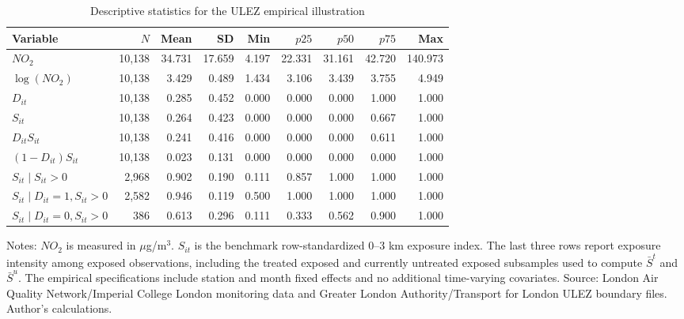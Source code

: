 \begin{table}[!htbp]\centering
\caption{Descriptive statistics for the ULEZ empirical illustration}
\label{tab:ulez_descriptive_statistics}
\begin{threeparttable}
\small
\setlength{\tabcolsep}{3pt}
\renewcommand{\arraystretch}{1.08}
\begin{tabularx}{\textwidth}{@{}>{\RaggedRight\arraybackslash}Xrrrrrrrr@{}}
\toprule
Variable & $N$ & Mean & SD & Min & $p25$ & $p50$ & $p75$ & Max \\
\midrule
$NO_2$ & 10,138 & 34.731 & 17.659 & 4.197 & 22.331 & 31.161 & 42.720 & 140.973 \\
$\log(NO_2)$ & 10,138 & 3.429 & 0.489 & 1.434 & 3.106 & 3.439 & 3.755 & 4.949 \\
$D_{it}$ & 10,138 & 0.285 & 0.452 & 0.000 & 0.000 & 0.000 & 1.000 & 1.000 \\
$S_{it}$ & 10,138 & 0.264 & 0.423 & 0.000 & 0.000 & 0.000 & 0.667 & 1.000 \\
$D_{it}S_{it}$ & 10,138 & 0.241 & 0.416 & 0.000 & 0.000 & 0.000 & 0.611 & 1.000 \\
$(1-D_{it})S_{it}$ & 10,138 & 0.023 & 0.131 & 0.000 & 0.000 & 0.000 & 0.000 & 1.000 \\
$S_{it}\mid S_{it}>0$ & 2,968 & 0.902 & 0.190 & 0.111 & 0.857 & 1.000 & 1.000 & 1.000 \\
$S_{it}\mid D_{it}=1,S_{it}>0$ & 2,582 & 0.946 & 0.119 & 0.500 & 1.000 & 1.000 & 1.000 & 1.000 \\
$S_{it}\mid D_{it}=0,S_{it}>0$ & 386 & 0.613 & 0.296 & 0.111 & 0.333 & 0.562 & 0.900 & 1.000 \\
\bottomrule
\end{tabularx}
\begin{tablenotes}[flushleft]
\footnotesize
\item Notes: $NO_2$ is measured in $\mu$g/m$^3$. $S_{it}$ is the benchmark row-standardized 0--3 km exposure index. The last three rows report exposure intensity among exposed observations, including the treated exposed and currently untreated exposed subsamples used to compute $\bar S^t$ and $\bar S^u$. The empirical specifications include station and month fixed effects and no additional time-varying covariates. Source: London Air Quality Network/Imperial College London monitoring data and Greater London Authority/Transport for London ULEZ boundary files. Author's calculations.
\end{tablenotes}
\end{threeparttable}
\end{table}
